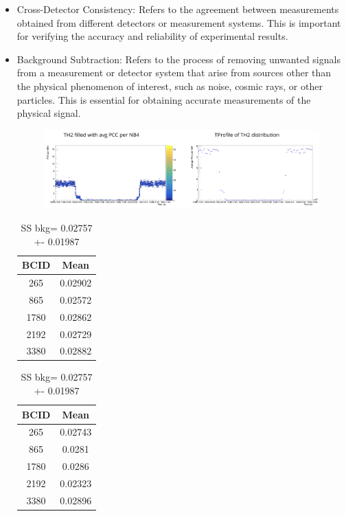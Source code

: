 \begin{itemize}
\item Cross-Detector Consistency: Refers to the agreement between measurements obtained from different detectors or measurement systems. This is important for verifying the accuracy and reliability of experimental results.

\item Background Subtraction: Refers to the process of removing unwanted signals from a measurement or detector system that arise from sources other than the physical phenomenon of interest, such as noise, cosmic rays, or other particles. This is essential for obtaining accurate measurements of the physical signal.


\begin{figure}[!htp]
\centering
\includegraphics[width=1\textwidth]{ashish_thesis/SS_background.png}
\caption[]{%
}
\label{fig:sigmavis_btob_variation}
\end{figure}

  
\begin{table}[ht]
  \begin{subtable}{0.5\linewidth}
    \centering
    \begin{tabular}{cc}
      \textbf{BCID} & \textbf{Mean} \\
      \hline
      265 & 0.02902 \\
      865 & 0.02572 \\
      1780 & 0.02862 \\
      2192 & 0.02729 \\
      3380 & 0.02882 \\
    \end{tabular}
    \caption{SS1_{avg}= 0.027894 }
  \end{subtable}%
  \begin{subtable}{0.5\linewidth}
    \centering
    \begin{tabular}{cc}
      \textbf{BCID} & \textbf{Mean} \\
      \hline
      265 & 0.02743 \\
      865 & 0.0281 \\
      1780 & 0.0286 \\
      2192 & 0.02323 \\
      3380 & 0.02896 \\
    \end{tabular}
    \caption{SS2_{avg}= 0.027264 }
  \end{subtable}
  \caption{SS bkg= 0.02757 +- 0.01987}
\end{table}



\end{itemize}
